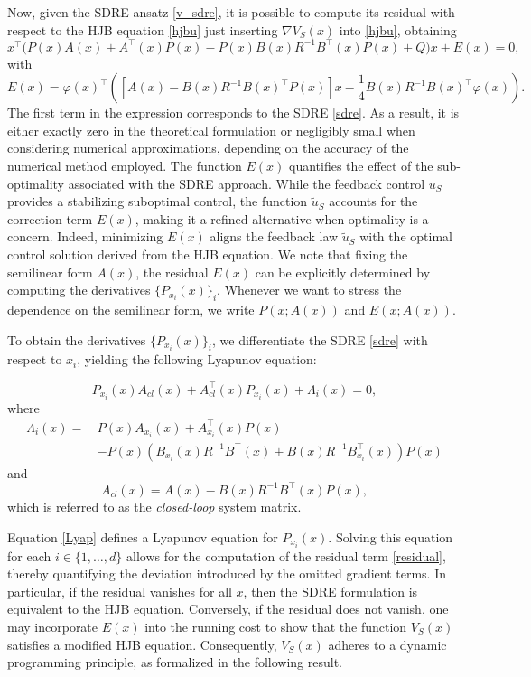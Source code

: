 \documentclass{article}
\begin{document}
Now, given the SDRE ansatz \eqref{v_sdre}, it is possible to compute its residual with respect to the HJB equation \eqref{hjbu} just inserting $\nabla V_S(x)$ into \eqref{hjbu}, obtaining 
$$
    x^\top \big( P(x) A(x) + A^\top(x) P(x) - P(x) B(x) R^{-1} B^\top(x) P(x) + Q \big) x +E(x) = 0,
    $$
    with
    \begin{equation}
        E(x) = \varphi(x)^\top   \left([A(x)- B(x)R^{-1}B(x)^\top P(x)] x - \frac{1}{4} B(x) R^{-1} B(x)^\top \varphi(x) \right).
        \label{residual}
    \end{equation}
The first term in the expression corresponds to the SDRE \eqref{sdre}. As a result, it is either exactly zero in the theoretical formulation or negligibly small when considering numerical approximations, depending on the accuracy of the numerical method employed. The function $E(x)$ quantifies the effect of the sub-optimality associated with the SDRE approach. While the feedback control $u_S$ provides a stabilizing suboptimal control, the function $\tilde{u}_{S}$ accounts for the correction term $E(x)$, making it a refined alternative when optimality is a concern. Indeed, minimizing $E(x)$  aligns the feedback law $\tilde{u}_{S}$ with the optimal control solution derived from the HJB equation. 
We note that fixing the semilinear form $A(x)$, the residual $E(x)$ can be explicitly determined by computing the derivatives \( \{P_{x_i}(x)\}_i \). Whenever we want to stress the dependence on the semilinear form, we write $P(x;A(x))$ and $E(x;A(x))$.

To obtain the derivatives \( \{P_{x_i}(x)\}_i \), we differentiate the SDRE \eqref{sdre} with respect to \(x_i\), yielding the following Lyapunov equation:

\begin{equation}
P_{x_i}(x)A_{cl}(x) + A_{cl}^\top(x)P_{x_i}(x) 
+\Lambda_i(x) = 0,\label{Lyap}
\end{equation}
where 
\begin{align*}
\Lambda_i(x) =\, &P(x)A_{x_i}(x) + A^\top_{x_i}(x)P(x) \nonumber\\[1mm]
& - P(x) (B_{x_i}(x)R^{-1}B^\top(x) + B(x)R^{-1}B^\top_{x_i}(x))P(x)
\end{align*}
and
\[
A_{cl}(x) = A(x) - B(x)R^{-1}B^\top(x)P(x),
\]
which is referred to as the \emph{closed-loop} system matrix.


Equation \eqref{Lyap} defines a Lyapunov equation for \(P_{x_i}(x)\). Solving this equation for each $i \in \{1, \dots, d\}$ allows for the computation of the residual term \eqref{residual}, thereby quantifying the deviation introduced by the omitted gradient terms.
In particular, if the residual vanishes for all $x$, then the SDRE formulation is equivalent to the HJB equation. Conversely, if the residual does not vanish, one may incorporate $E(x)$ into the running cost to show that the function $V_S(x)$ satisfies a modified HJB equation. Consequently, $V_S(x)$ adheres to a dynamic programming principle, as formalized in the following result.
\end{document}
